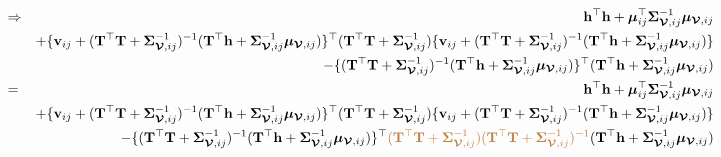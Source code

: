 \documentclass[12pt]{article}
\newcommand{\0}{\mathbf{0}}
\begin{document}
\begin{eqnarray*}
& \Rightarrow & \mathbf{h}^{\top} \mathbf{h} + \boldsymbol{\mu}_{ij}^{\top} \boldsymbol{\Sigma}_{\boldsymbol{\mathcal{V}}, ij}^{-1} \boldsymbol{\mu}_{\boldsymbol{\mathcal{V}}, ij} \\
&& + \{ \mathbf{v}_{ij} + ( \mathbf{T}^{\top} \mathbf{T} + \boldsymbol{\Sigma}_{\boldsymbol{\mathcal{V}}, ij}^{-1} )^{-1} ( \mathbf{T}^{\top} \mathbf{h} + \boldsymbol{\Sigma}_{\boldsymbol{\mathcal{V}}, ij}^{-1}\boldsymbol{\mu}_{\boldsymbol{\mathcal{V}}, ij} ) \}^{\top} ( \mathbf{T}^{\top} \mathbf{T} + \boldsymbol{\Sigma}_{\boldsymbol{\mathcal{V}}, ij}^{-1} ) \{ \mathbf{v}_{ij} + ( \mathbf{T}^{\top} \mathbf{T} + \boldsymbol{\Sigma}_{\boldsymbol{\mathcal{V}}, ij}^{-1} )^{-1} ( \mathbf{T}^{\top} \mathbf{h} + \boldsymbol{\Sigma}_{\boldsymbol{\mathcal{V}}, ij}^{-1}\boldsymbol{\mu}_{\boldsymbol{\mathcal{V}}, ij} ) \} \\
&& - \{ ( \mathbf{T}^{\top} \mathbf{T} + \boldsymbol{\Sigma}_{\boldsymbol{\mathcal{V}}, ij}^{-1} )^{-1} ( \mathbf{T}^{\top} \mathbf{h} + \boldsymbol{\Sigma}_{\boldsymbol{\mathcal{V}}, ij}^{-1}\boldsymbol{\mu}_{\boldsymbol{\mathcal{V}}, ij} ) \}^{\top} ( \mathbf{T}^{\top} \mathbf{h} + \boldsymbol{\Sigma}_{\boldsymbol{\mathcal{V}}, ij}^{-1}\boldsymbol{\mu}_{\boldsymbol{\mathcal{V}}, ij} ) \\
& = & \mathbf{h}^{\top} \mathbf{h} + \boldsymbol{\mu}_{ij}^{\top} \boldsymbol{\Sigma}_{\boldsymbol{\mathcal{V}}, ij}^{-1} \boldsymbol{\mu}_{\boldsymbol{\mathcal{V}}, ij} \\
&& +  \{ \mathbf{v}_{ij} + ( \mathbf{T}^{\top} \mathbf{T} + \boldsymbol{\Sigma}_{\boldsymbol{\mathcal{V}}, ij}^{-1} )^{-1}  ( \mathbf{T}^{\top} \mathbf{h} + \boldsymbol{\Sigma}_{\boldsymbol{\mathcal{V}}, ij}^{-1}\boldsymbol{\mu}_{\boldsymbol{\mathcal{V}}, ij} ) \}^{\top} ( \mathbf{T}^{\top} \mathbf{T} + \boldsymbol{\Sigma}_{\boldsymbol{\mathcal{V}}, ij}^{-1} ) \{ \mathbf{v}_{ij} + ( \mathbf{T}^{\top} \mathbf{T} + \boldsymbol{\Sigma}_{\boldsymbol{\mathcal{V}}, ij}^{-1} )^{-1}  ( \mathbf{T}^{\top} \mathbf{h} + \boldsymbol{\Sigma}_{\boldsymbol{\mathcal{V}}, ij}^{-1}\boldsymbol{\mu}_{\boldsymbol{\mathcal{V}}, ij} ) \} \\
&& - \{ ( \mathbf{T}^{\top} \mathbf{T} + \boldsymbol{\Sigma}_{\boldsymbol{\mathcal{V}}, ij}^{-1} )^{-1} ( \mathbf{T}^{\top} \mathbf{h} + \boldsymbol{\Sigma}_{\boldsymbol{\mathcal{V}}, ij}^{-1}\boldsymbol{\mu}_{\boldsymbol{\mathcal{V}}, ij} ) \}^{\top}\textcolor{brown}{ ( \mathbf{T}^{\top} \mathbf{T} + \boldsymbol{\Sigma}_{\boldsymbol{\mathcal{V}}, ij}^{-1} ) ( \mathbf{T}^{\top} \mathbf{T} + \boldsymbol{\Sigma}_{\boldsymbol{\mathcal{V}}, ij}^{-1} )^{-1}} ( \mathbf{T}^{\top} \mathbf{h} + \boldsymbol{\Sigma}_{\boldsymbol{\mathcal{V}}, ij}^{-1}\boldsymbol{\mu}_{\boldsymbol{\mathcal{V}}, ij} )
\end{eqnarray*}
\end{document}
